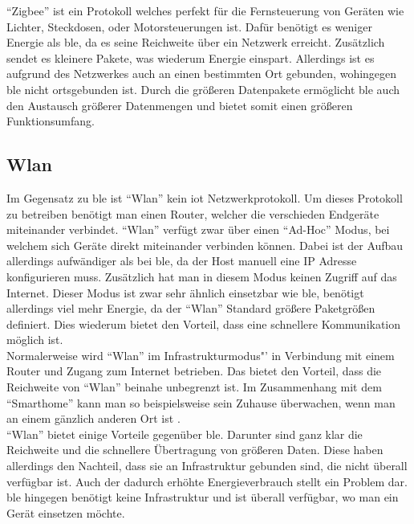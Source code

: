 \noindent "`Zigbee"' ist ein Protokoll welches perfekt für die Fernsteuerung von Geräten wie Lichter, Steckdosen, oder Motorsteuerungen ist. Dafür benötigt es weniger Energie als \ac{ble}, da es seine Reichweite über ein Netzwerk erreicht. Zusätzlich sendet es kleinere Pakete, was wiederum Energie einspart. Allerdings ist es aufgrund des Netzwerkes auch an einen bestimmten Ort gebunden, wohingegen \ac{ble} nicht ortsgebunden ist. Durch die größeren Datenpakete ermöglicht \ac{ble} auch den Austausch größerer Datenmengen und bietet somit einen größeren Funktionsumfang.\\

\subsection{Wlan}
\label{ss:vergleich:wifi}

Im Gegensatz zu \ac{ble} ist "`Wlan"' kein \ac{iot} Netzwerkprotokoll. Um dieses Protokoll zu betreiben benötigt man einen Router, welcher die verschieden Endgeräte miteinander verbindet. "`Wlan"' verfügt zwar über einen "`Ad-Hoc"' Modus, bei welchem sich Geräte direkt miteinander verbinden können. Dabei ist der Aufbau allerdings aufwändiger als bei \ac{ble}, da der Host manuell eine IP Adresse konfigurieren muss. Zusätzlich hat man in diesem Modus keinen Zugriff auf das Internet. Dieser Modus ist zwar sehr ähnlich einsetzbar wie \ac{ble}, benötigt allerdings viel mehr Energie, da der "`Wlan"' Standard größere Paketgrößen definiert. Dies wiederum bietet den Vorteil, dass eine schnellere Kommunikation möglich ist.\\

\noindent Normalerweise wird "`Wlan"' im Infrastrukturmodus"' in Verbindung mit einem Router und Zugang zum Internet betrieben. Das bietet den Vorteil, dass die Reichweite von "`Wlan"' beinahe unbegrenzt ist. Im Zusammenhang mit dem "`Smarthome"' kann man so beispielsweise sein Zuhause überwachen, wenn man an einem gänzlich anderen Ort ist \cite{MUE:Wlan}.\\

\noindent "`Wlan"' bietet einige Vorteile gegenüber \ac{ble}. Darunter sind ganz klar die Reichweite und die schnellere Übertragung von größeren Daten. Diese haben allerdings den Nachteil, dass sie an Infrastruktur gebunden sind, die nicht überall verfügbar ist. Auch der dadurch erhöhte Energieverbrauch stellt ein Problem dar. \ac{ble} hingegen benötigt keine Infrastruktur und ist überall verfügbar, wo man ein Gerät einsetzen möchte.\\ 

